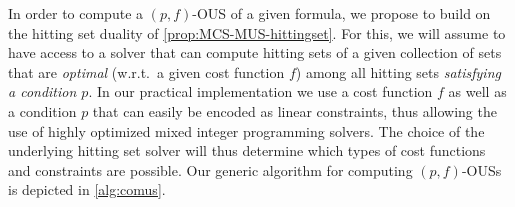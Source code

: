 In order to compute a $(p,f)$-OUS of a given formula, we propose to build on the hitting set duality of \cref{prop:MCS-MUS-hittingset}. 
For this, we will assume to have access to a solver \cohs that can compute hitting sets of a given collection of sets that are \emph{optimal} (w.r.t.\ a given cost function $f$) among all hitting sets \emph{satisfying a condition $p$}. 
In our practical implementation we use a cost function $f$ as well as a condition $p$ that can easily be encoded as linear constraints, thus allowing the use of highly optimized mixed integer programming solvers.
The choice of the underlying hitting set solver will thus determine which types of cost functions and constraints are possible. 
Our generic algorithm for computing $(p,f)$-OUSs is depicted in \cref{alg:comus}.  
\begin{algorithm}[t]
  \DontPrintSemicolon
  \caption{$\comus(\formula,f,p)$ }
  \label{alg:comus}
\end{algorithm}



